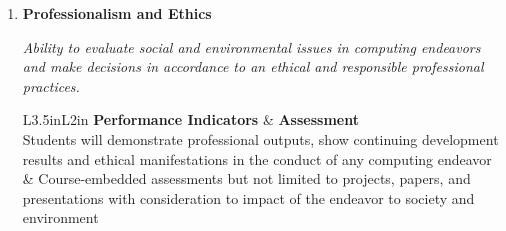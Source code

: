 \documentclass[11pt,a4paper]{article}
\begin{document}
\begin{enumerate}

\item {\bf Professionalism and Ethics}

\textit{Ability to evaluate social and environmental issues in computing endeavors and make decisions in accordance to an ethical and responsible professional practices.}

\begin{tabular}{L{3.5in}L{2in}}
\hline
{\bf Performance Indicators} & {\bf Assessment} \\
\hline
Students will demonstrate professional outputs, show continuing development results and ethical manifestations in the conduct of any computing endeavor & Course-embedded assessments but not limited to projects, papers, and presentations with consideration to impact of the endeavor to society and environment\\


\end{tabular}
\end{enumerate}
\end{document}
